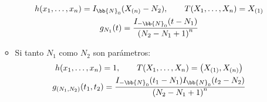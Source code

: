 \begin{ejercicio}
\begin{enumerate}[label=\alph*)]
\begin{itemize}
                    \begin{gather*}
                        h(x_1, \ldots, x_n) = I_{\bb{N}_0}(X_{(n)}-N_2), \qquad T(X_1, \ldots, X_n) = X_{(1)} \\
                        g_{N_1}(t) = \dfrac{I_{-\bb{N}_0}(t-N_1)}{{(N_2-N_1+1)}^{n}}
                    \end{gather*}
                \item Si tanto $N_1$ como $N_2$ son parámetros:
                    \begin{gather*}
                        h(x_1,\ldots,x_n) = 1, \qquad T(X_1, \ldots, X_n) = \left(X_{(1)}, X_{(n)}\right) \\
                        g_{(N_1,N_2)}(t_1,t_2) = \dfrac{I_{-\bb{N}_0}(t_1-N_1)I_{\bb{N}_0}(t_2-N_2)}{{(N_2-N_1+1)}^{n}}
                    \end{gather*}
            \end{itemize}
    \end{enumerate}
\end{ejercicio}

